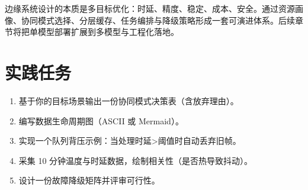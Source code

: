 边缘系统设计的本质是多目标优化：时延、精度、稳定、成本、安全。通过资源画像、协同模式选择、分层缓存、任务编排与降级策略形成一套可演进体系。后续章节将把单模型部署扩展到多模型与工程化落地。

\section{实践任务}\label{ux5b9eux8df5ux4efbux52a1}

\begin{enumerate}
\def\labelenumi{\arabic{enumi}.}
\tightlist
\item
  基于你的目标场景输出一份协同模式决策表（含放弃理由）。
\item
  编写数据生命周期图（ASCII 或 Mermaid）。
\item
  实现一个队列背压示例：当处理时延\textgreater 阈值时自动丢弃旧帧。
\item
  采集 10 分钟温度与时延数据，绘制相关性（是否热导致抖动）。
\item
  设计一份故障降级矩阵并评审可行性。
\end{enumerate}

